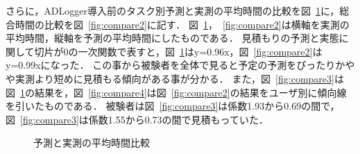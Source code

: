 さらに，ADLogger導入前のタスク別予測と実測の平均時間の比較を図~\ref{fig:compare}に，総合時間の比較を図~\ref{fig:compare2}に記す．
図~\ref{fig:compare}，~\ref{fig:compare2}は横軸を実測の平均時間，縦軸を予測の平均時間にしたものである．
見積もりの予測と実態に関して切片が0の一次関数で表すと，図~\ref{fig:compare}はy=0.96x，図~\ref{fig:compare2}はy=0.99xになった．
この事から被験者を全体で見ると予定の予測をぴったりかやや実測より短めに見積もる傾向がある事が分かる．
また，図~\ref{fig:compare3}は図~\ref{fig:compare}の結果を，図~\ref{fig:compare4}は図~\ref{fig:compare2}の結果をユーザ別に傾向線を引いたものである．
被験者は図~\ref{fig:compare3}は係数1.93から0.69の間で，図~\ref{fig:compare3}は係数1.55から0.73の間で見積もっていた．

\begin{figure}[ht]
	\begin{center}
		\caption{予測と実測の平均時間比較}
		\label{fig:compare}
	\end{center}
\end{figure}

